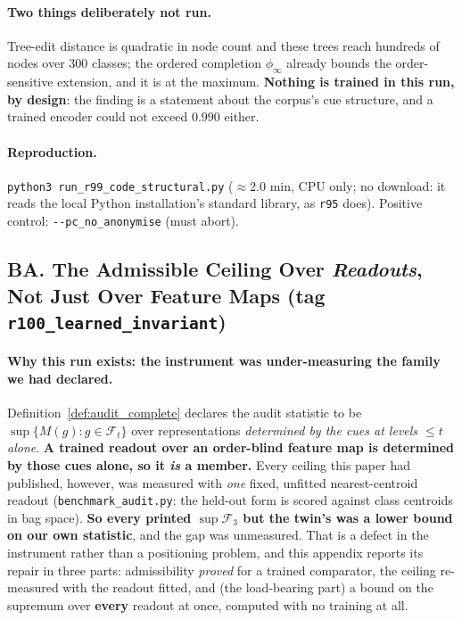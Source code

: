 \paragraph{Two things deliberately not run.} Tree-edit distance is quadratic in node count and these trees reach hundreds of nodes over $300$ classes; the ordered completion $\phi_\infty$ already bounds the order-sensitive extension, and it is at the maximum. \textbf{Nothing is trained in this run, by design}: the finding is a statement about the corpus's cue structure, and a trained encoder could not exceed $0.990$ either.

\paragraph{Reproduction.} \texttt{python3 run\_r99\_code\_structural.py} ($\approx2.0$ min, CPU only; no download: it reads the local Python installation's standard library, as \texttt{r95} does). Positive control: \texttt{-{}-pc\_no\_anonymise} (must abort).

\subsection*{BA. The Admissible Ceiling Over \emph{Readouts}, Not Just Over Feature Maps (tag \texttt{r100\_learned\_invariant})}

\paragraph{Why this run exists: the instrument was under-measuring the family we had declared.} Definition~\ref{def:audit_complete} declares the audit statistic to be $\sup\{M(g):g\in\mathcal{F}_t\}$ over representations \emph{determined by the cues at levels ${\leq}t$ alone}. \textbf{A trained readout over an order-blind feature map is determined by those cues alone, so it \emph{is} a member.} Every ceiling this paper had published, however, was measured with \emph{one} fixed, unfitted nearest-centroid readout (\texttt{benchmark\_audit.py}: the held-out form is scored against class centroids in bag space). \textbf{So every printed $\sup\mathcal{F}_3$ but the twin's was a lower bound on our own statistic}, and the gap was unmeasured. That is a defect in the instrument rather than a positioning problem, and this appendix reports its repair in three parts: admissibility \emph{proved} for a trained comparator, the ceiling re-measured with the readout fitted, and (the load-bearing part) a bound on the supremum over \textbf{every} readout at once, computed with no training at all.

